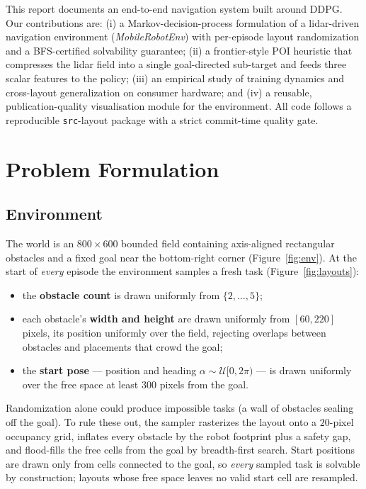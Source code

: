 \documentclass[11pt,a4paper]{article}
\begin{document}
This report documents an end-to-end navigation system built around DDPG. Our
contributions are: (i) a Markov-decision-process formulation of a lidar-driven
navigation environment (\emph{MobileRobotEnv}) with per-episode layout
randomization and a BFS-certified solvability guarantee; (ii) a frontier-style
POI heuristic that compresses the lidar field into a single goal-directed
sub-target and feeds three scalar features to the policy; (iii) an empirical
study of training dynamics and cross-layout generalization on consumer
hardware; and (iv) a reusable, publication-quality visualisation module for
the environment. All code follows a reproducible \texttt{src}-layout package
with a strict commit-time quality gate.

\section{Problem Formulation}
\subsection{Environment}
The world is an $800 \times 600$ bounded field containing axis-aligned
rectangular obstacles and a fixed goal near the bottom-right corner
(Figure~\ref{fig:env}). At the start of \emph{every} episode the environment
samples a fresh task (Figure~\ref{fig:layouts}):

\begin{itemize}
  \item the \textbf{obstacle count} is drawn uniformly from $\{2,\dots,5\}$;
  \item each obstacle's \textbf{width and height} are drawn uniformly from
        $[60, 220]$ pixels, its position uniformly over the field, rejecting
        overlaps between obstacles and placements that crowd the goal;
  \item the \textbf{start pose} — position and heading
        $\alpha \sim \mathcal{U}[0, 2\pi)$ — is drawn uniformly over the free
        space at least $300$ pixels from the goal.
\end{itemize}

Randomization alone could produce impossible tasks (a wall of obstacles
sealing off the goal). To rule these out, the sampler rasterizes the layout
onto a $20$-pixel occupancy grid, inflates every obstacle by the robot
footprint plus a safety gap, and flood-fills the free cells from the goal by
breadth-first search. Start positions are drawn only from cells connected to
the goal, so \emph{every} sampled task is solvable by construction; layouts
whose free space leaves no valid start cell are resampled.
\end{document}
